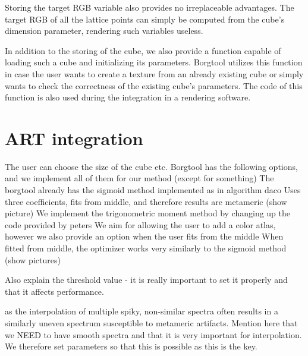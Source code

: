 Storing the target RGB variable also provides no irreplaceable advantages. The target RGB of all the lattice points can simply be computed from the cube's dimension parameter, rendering such variables useless.

In addition to the storing of the cube, we also provide a function capable of loading such a cube and initializing its parameters. Borgtool utilizes this function in case the user wants to create a texture from an already existing cube or simply wants to check the correctness of the existing cube's parameters. The code of this function is also used during the integration in a rendering software.

\section{ART integration}

The user can choose the size of the cube etc. Borgtool has the following options, and we implement all of them for our method (except for something)
The borgtool already has the sigmoid method implemented as in algorithm daco
Uses three coefficients, fits from middle, and therefore results are metameric (show picture)
We implement the trigonometric moment method by changing up the code provided by peters
We aim for allowing the user to add a color atlas, however we also provide an option when the user fits from the middle
When fitted from middle, the optimizer works very similarly to the sigmoid method (show pictures)

Also explain the threshold value - it is really important to set it properly and that it affects performance.


 as the interpolation of multiple spiky, non-similar spectra often results in a similarly uneven spectrum susceptible to metameric artifacts. Mention here that we NEED to have smooth spectra and that it is very important for interpolation. We therefore set parameters so that this is possible as this is the key. 
